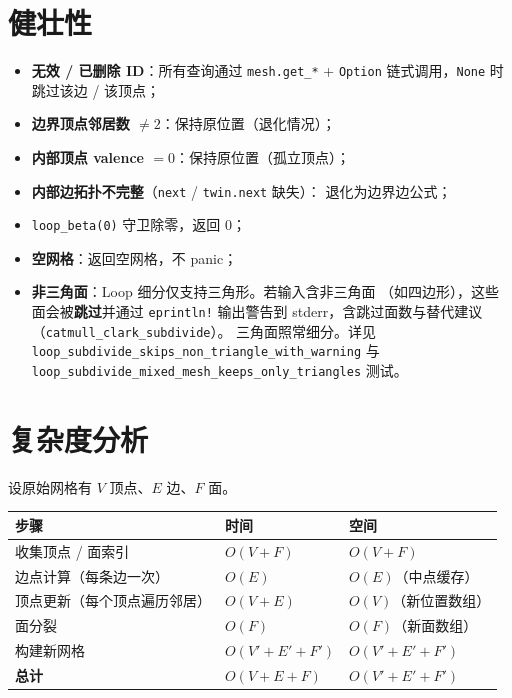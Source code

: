 \documentclass[11pt,a4paper]{article}
\begin{document}
\section{健壮性}

\begin{itemize}
  \item \textbf{无效 / 已删除 ID}：所有查询通过 \texttt{mesh.get\_*} + \texttt{Option}
        链式调用，\texttt{None} 时跳过该边 / 该顶点；
  \item \textbf{边界顶点邻居数 $\neq 2$}：保持原位置（退化情况）；
  \item \textbf{内部顶点 valence $= 0$}：保持原位置（孤立顶点）；
  \item \textbf{内部边拓扑不完整}（\texttt{next} / \texttt{twin.next} 缺失）：
        退化为边界边公式；
  \item \texttt{loop\_beta(0)} 守卫除零，返回 $0$；
  \item \textbf{空网格}：返回空网格，不 panic；
  \item \textbf{非三角面}：Loop 细分仅支持三角形。若输入含非三角面
        （如四边形），这些面会被\textbf{跳过}并通过 \texttt{eprintln!}
        输出警告到 stderr，含跳过面数与替代建议（\texttt{catmull\_clark\_subdivide}）。
        三角面照常细分。详见 \texttt{loop\_subdivide\_skips\_non\_triangle\_with\_warning}
        与 \texttt{loop\_subdivide\_mixed\_mesh\_keeps\_only\_triangles} 测试。
\end{itemize}

\section{复杂度分析}

设原始网格有 $V$ 顶点、$E$ 边、$F$ 面。

\begin{center}
\renewcommand{\arraystretch}{1.20}
\begin{tabular}{@{}lll@{}}
  \toprule
  \textbf{步骤} & \textbf{时间} & \textbf{空间} \\
  \midrule
  收集顶点 / 面索引     & $O(V + F)$       & $O(V + F)$ \\
  边点计算（每条边一次） & $O(E)$           & $O(E)$（中点缓存） \\
  顶点更新（每个顶点遍历邻居） & $O(V + E)$ & $O(V)$（新位置数组） \\
  面分裂                & $O(F)$           & $O(F)$（新面数组） \\
  构建新网格            & $O(V' + E' + F')$ & $O(V' + E' + F')$ \\
  \midrule
  \textbf{总计}         & $O(V + E + F)$   & $O(V' + E' + F')$ \\
  \bottomrule
\end{tabular}
\end{center}
\end{document}
